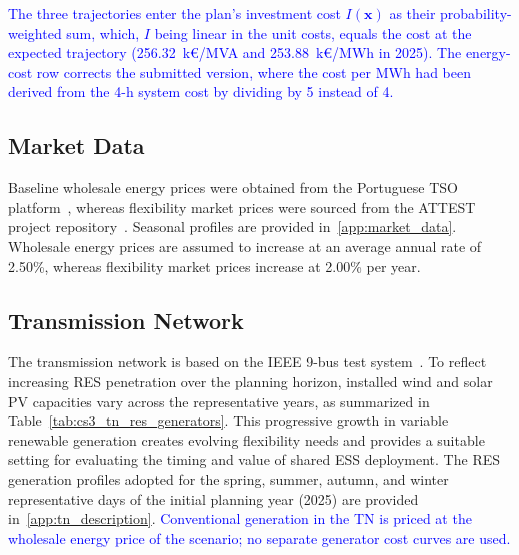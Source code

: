 \documentclass[preprint,12pt]{elsarticle}
\begin{document}

\textcolor{blue}{
    The three trajectories enter the plan's investment cost $I(\boldsymbol{x})$ as their probability-weighted sum, which, $I$ being linear in the unit costs, equals the cost at the expected trajectory (256.32~k\euro/MVA and 253.88~k\euro/MWh in 2025). The energy-cost row corrects the submitted version, where the cost per MWh had been derived from the 4-h system cost by dividing by 5 instead of 4.
}

\subsection{Market Data}

Baseline wholesale energy prices were obtained from the Portuguese TSO platform~\cite{ren_market_platform}, whereas flexibility market prices were sourced from the ATTEST project repository~\cite{attest_project_repo}. Seasonal profiles are provided in~\ref{app:market_data}. Wholesale energy prices are assumed to increase at an average annual rate of 2.50\%, whereas flexibility market prices increase at 2.00\% per year.

\subsection{Transmission Network}

The transmission network is based on the IEEE 9-bus test system~\cite{zimmerman_2011}. To reflect increasing RES penetration over the planning horizon, installed wind and solar PV capacities vary across the representative years, as summarized in Table~\ref{tab:cs3_tn_res_generators}. This progressive growth in variable renewable generation creates evolving flexibility needs and provides a suitable setting for evaluating the timing and value of shared ESS deployment. The RES generation profiles adopted for the spring, summer, autumn, and winter representative days of the initial planning year (2025) are provided in~\ref{app:tn_description}.
\textcolor{blue}{
    Conventional generation in the TN is priced at the wholesale energy price of the scenario; no separate generator cost curves are used.
}
\end{document}
